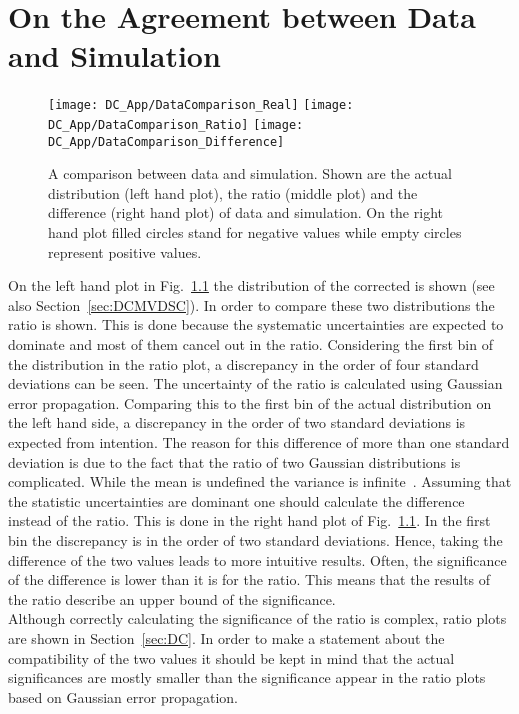 \chapter{On the Agreement between Data and Simulation \label{sec:DCPvalue}}

\begin{figure}[!h]
  \centering
  \texttt{[image: DC\_App/DataComparison\_Real]}
  \texttt{[image: DC\_App/DataComparison\_Ratio]}
  \texttt{[image: DC\_App/DataComparison\_Difference]}
\caption[Comparison between data and simulation: Actual distributions, ratio and difference]{A comparison between data and simulation. Shown are the actual distribution (left hand plot), the ratio (middle plot) and the difference (right hand plot) of data and simulation. On the right hand plot filled circles stand for negative values while empty circles represent positive values. \label{plot:DCPvalue}}
\end{figure}

On the left hand plot in Fig.~\ref{plot:DCPvalue} the distribution of the corrected \MET{} is shown (see also Section~\ref{sec:DCMVDSC}). In order to compare these two distributions the ratio is shown. This is done because the systematic uncertainties are expected to dominate and most of them cancel out in the ratio. Considering the first bin of the distribution in the ratio plot, a discrepancy in the order of four standard deviations can be seen. The uncertainty of the ratio is calculated using Gaussian error propagation. Comparing this to the first bin of the actual distribution on the left hand side, a discrepancy in the order of two standard deviations is expected from intention. The reason for this difference of more than one standard deviation is due to the fact that the ratio of two Gaussian distributions is complicated. While the mean is undefined the variance is infinite~\cite{ratioMail}. Assuming that the statistic uncertainties are dominant one should calculate the difference instead of the ratio. This is done in the right hand plot of Fig.~\ref{plot:DCPvalue}. In the first bin the discrepancy is in the order of two standard deviations. Hence, taking the difference of the two values leads to more intuitive results. Often, the significance of the difference is lower than it is for the ratio. This means that the results of the ratio describe an upper bound of the significance. \\
Although correctly calculating the significance of the ratio is complex, ratio plots are shown in Section~\ref{sec:DC}. In order to make a statement about the compatibility of the two values it should be kept in mind that the actual significances are mostly smaller than the significance appear in the ratio plots based on Gaussian error propagation.
